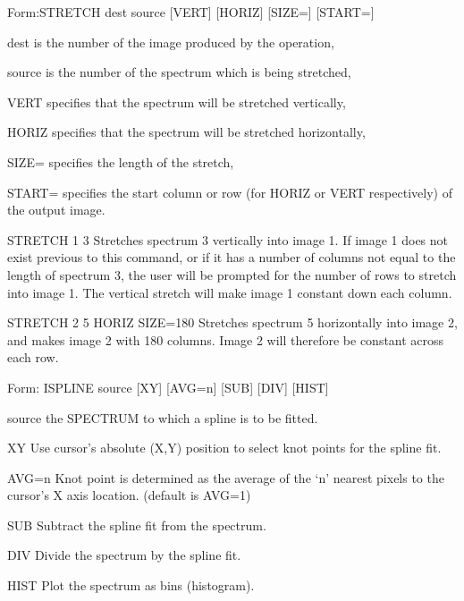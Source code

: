 {\newpage\clearpage
{}%
\begin{command}
  \item[Form:STRETCH dest source {[VERT]} {[HORIZ]} {[SIZE=]} 
       {[START=]}\hfill]{}
  \item[dest]{is the number of the image produced by the operation,}
  \item[source]{is the number of the spectrum which is being stretched,}
  \item[VERT]{specifies that the spectrum will be stretched vertically,}
  \item[HORIZ]{specifies that the spectrum will be stretched horizontally,}
  \item[SIZE=]{specifies the length of the stretch,}
  \item[START=]{specifies the start column or row (for HORIZ or
       VERT respectively) of the output image.}
\end{command}%
\lthtmlfigureZ
\lthtmlcheckvsize\clearpage}

{\newpage\clearpage
{}%
\begin{example}
  \item[STRETCH 1 3\hfill]{Stretches spectrum 3 vertically into image 1.
       If image 1 does not exist previous to this command, or if it has a
       number of columns not equal to the length of spectrum 3, the user
       will be prompted for the number of rows to stretch into image 1.
       The vertical stretch will make image 1 constant down each column.}
\par
\item[STRETCH 2 5 HORIZ SIZE=180\hfill]{Stretches spectrum 5 horizontally
       into image 2, and makes image 2 with 180 columns.  Image 2 will
       therefore be constant across each row.}
\end{example}%
\lthtmlfigureZ
\lthtmlcheckvsize\clearpage}

{\newpage\clearpage
{}%
\begin{command} 
  \item[Form: ISPLINE source {[XY]} {[AVG=n]} {[SUB]} {[DIV]} {[HIST]}\hfill]{}
  \item[source]{the SPECTRUM to which a spline is to be fitted.}
  \item[XY]{Use cursor's absolute (X,Y) position to select
       knot points for the spline fit.}
  \item[AVG=n]{Knot point is determined as the average of the
       `n' nearest pixels to the cursor's X axis location. (default is AVG=1)}
  \item[SUB]{Subtract the spline fit from the spectrum.}
  \item[DIV]{Divide the spectrum by the spline fit.}
  \item[HIST]{Plot the spectrum as bins (histogram).}
\end{command}%
\lthtmlfigureZ
\lthtmlcheckvsize\clearpage}

